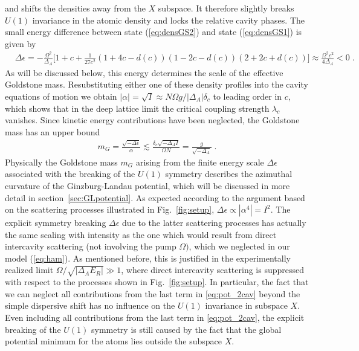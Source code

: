 \documentclass[12pt]{iopart}
\begin{document}
and shifts the densities away from the $X$ subspace. It
therefore slightly breaks $U(1)$ invariance in the atomic density and
locks the relative cavity phases. The small energy difference between
state (\ref{eq:densGS2}) and state (\ref{eq:densGS1}) is  given by
\begin{align}
\label{eq:energyshift}
&\Delta \epsilon=-\frac{\Omega^2}{\Delta_A}\bigg[1+c
+\frac{1}{27c^2}\left(1+4 c-d(c)\right)\left(1-2 c -d(c)\right)
\left(2+2c+d(c)\right)\bigg]\approx\frac{\Omega^2 c^2}{4 \Delta_A}<0\;.
\end{align}
As will be discussed below, this energy determines the scale of the effective Goldstone mass. 
Resubstituting either one of these density profiles into the cavity equations of motion we obtain
$|\alpha|=\sqrt{I}\approx N\Omega g /|\Delta_A|\delta_c$ to leading order in $c$,
which shows that in the deep lattice limit the critical coupling
strength $\lambda_c$ vanishes.  Since kinetic energy contributions have been neglected, 
the Goldstone mass has an upper bound
\begin{align}
\label{eq:mG}
m_G =\frac{\sqrt{-\Delta \epsilon}}{\alpha}\lesssim \frac{\delta_c\sqrt{-\Delta_A I}}{\Omega N}=\frac{g}{\sqrt{-\Delta_A}}\;.
\end{align}
Physically the Goldstone mass $m_G$ arising from the finite energy scale 
$\Delta \epsilon$ associated with the breaking of the $U(1)$ symmetry
describes the azimuthal curvature of the Ginzburg-Landau
potential, which will be discussed in more detail in section~\ref{sec:GLpotential}.
As expected according to the argument based on the scattering processes
illustrated in Fig.~\ref{fig:setup}, $\Delta\epsilon\propto |\alpha^4|=I^2$.
The explicit symmetry breaking $\Delta\epsilon$ due to the latter
scattering processes has actually the same scaling with intensity as
the one which would result from direct intercavity scattering (not
involving the pump $\Omega)$, which we neglected in our model
(\ref{eq:ham}). As mentioned before, this is justified in the
experimentally realized limit $\Omega/\sqrt{|\Delta_A E_R|}\gg 1$, where direct
intercavity scattering is suppressed with respect to the processes
shown in Fig.~\ref{fig:setup}. In particular, the fact that we can
neglect all contributions from the last term in \eqref{eq:pot_2cav}
beyond the simple dispersive shift has no influence on the $U(1)$
invariance in subspace $X$. 
Even including all contributions from the last term in \eqref{eq:pot_2cav}, the explicit breaking of the
$U(1)$ symmetry is still caused by the fact that the global potential minimum
for the atoms lies outside the subspace $X$.
\end{document}
